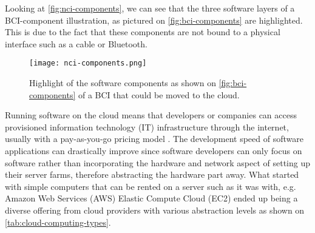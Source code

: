 Looking at \autoref{fig:nci-components}, we can see that the three software layers of a BCI-component illustration, as pictured on \autoref{fig:bci-components} are highlighted. This is due to the fact that these components are not bound to a physical interface such as a cable or Bluetooth.

\begin{figure}[ht]
  \centering
  \texttt{[image: nci-components.png]}
  \caption{Highlight of the software components as shown on \autoref{fig:bci-components} of a BCI that could be moved to the cloud.}
  \label{fig:nci-components}
\end{figure}

Running software on the cloud means that developers or companies can access provisioned information technology (IT) infrastructure through the internet, usually with a pay-as-you-go pricing model \citep{amazon_web_services_inc_what_nodate}. The development speed of software applications can drastically improve since software developers can only focus on software rather than incorporating the hardware and network aspect of setting up their server farms, therefore abstracting the hardware part away. What started with simple computers that can be rented on a server such as it was with, e.g. Amazon Web Services (AWS) Elastic Compute Cloud (EC2) \citep{barr_amazon_2006} ended up being a diverse offering from cloud providers with various abstraction levels as shown on \autoref{tab:cloud-computing-types}.

